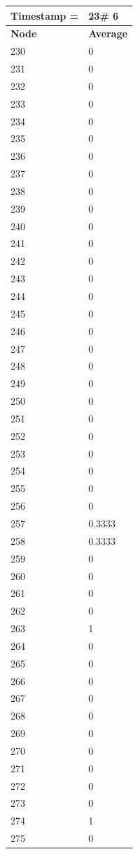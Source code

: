 \begin{tabular}{|l||l|}
\hline
\textbf{Timestamp =} & \textbf{23}\# 6\\\hline
	\textbf{Node} & \textbf{Average} \\ \hline
\hline
	230 & 0 \\ \hline
	231 & 0 \\ \hline
	232 & 0 \\ \hline
	233 & 0 \\ \hline
	234 & 0 \\ \hline
	235 & 0 \\ \hline
	236 & 0 \\ \hline
	237 & 0 \\ \hline
	238 & 0 \\ \hline
	239 & 0 \\ \hline
	240 & 0 \\ \hline
	241 & 0 \\ \hline
	242 & 0 \\ \hline
	243 & 0 \\ \hline
	244 & 0 \\ \hline
	245 & 0 \\ \hline
	246 & 0 \\ \hline
	247 & 0 \\ \hline
	248 & 0 \\ \hline
	249 & 0 \\ \hline
	250 & 0 \\ \hline
	251 & 0 \\ \hline
	252 & 0 \\ \hline
	253 & 0 \\ \hline
	254 & 0 \\ \hline
	255 & 0 \\ \hline
	256 & 0 \\ \hline
	257 & 0.3333 \\ \hline
	258 & 0.3333 \\ \hline
	259 & 0 \\ \hline
	260 & 0 \\ \hline
	261 & 0 \\ \hline
	262 & 0 \\ \hline
	263 & 1 \\ \hline
	264 & 0 \\ \hline
	265 & 0 \\ \hline
	266 & 0 \\ \hline
	267 & 0 \\ \hline
	268 & 0 \\ \hline
	269 & 0 \\ \hline
	270 & 0 \\ \hline
	271 & 0 \\ \hline
	272 & 0 \\ \hline
	273 & 0 \\ \hline
	274 & 1 \\ \hline
	275 & 0 \\ \hline
\end{tabular}

